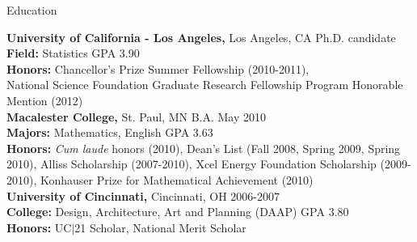 \documentclass{resume} %
\begin{document}

\begin{rSection}{Education}

{\bf University of California - Los Angeles,} Los Angeles, CA \hfill Ph.D. candidate\\ 
{\bf Field:} Statistics \hfill GPA 3.90 \smallskip \\
{\bf Honors:} Chancellor's Prize Summer Fellowship (2010-2011), \\ National Science Foundation Graduate Research Fellowship Program Honorable Mention (2012)\\

{\bf Macalester College,} St. Paul, MN \hfill B.A. May 2010 \\
{\bf Majors:} Mathematics, English \hfill GPA 3.63 \smallskip \\
{\bf Honors:} {\em Cum laude} honors (2010), Dean's List (Fall 2008, Spring 2009, Spring 2010), Alliss Scholarship (2007-2010), Xcel Energy Foundation Scholarship (2009-2010), Konhauser Prize for Mathematical Achievement (2010) \\

{\bf University of Cincinnati,} Cincinnati, OH \hfill 2006-2007 \\
{\bf College:} Design, Architecture, Art and Planning (DAAP) \hfill GPA 3.80 \smallskip \\
{\bf Honors:} UC$|$21 Scholar, National Merit Scholar

\end{rSection}

\end{document}
